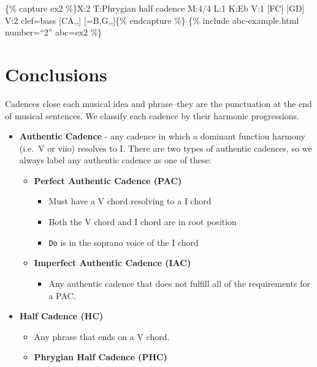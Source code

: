 \documentclass{book}
\providecommand{\tightlist}{%
  \setlength{\itemsep}{0pt}\setlength{\parskip}{0pt}}
\begin{document}
\{\% capture ex2 \%\}X:2 T:Phrygian half cadence M:4/4 L:1 K:Eb V:1
{[}FC{]}\textbar{} {[}GD{]}\textbar{]} V:2 clef=bass {[}CA,,{]}\textbar{}
{[}=B,G,,{]}\textbar{]}\{\% endcapture \%\} \{\% include abc-example.html
number=``2'' abc=ex2 \%\}

\hypertarget{conclusions-1}{%
\section{Conclusions}\label{conclusions-1}}

Cadences close each musical idea and phrase--they are the punctuation at the
end of musical sentences. We classify each cadence by their harmonic
progressions.

\begin{itemize}
\tightlist
\item
  \textbf{Authentic Cadence} - any cadence in which a dominant function
  harmony (i.e.~V or viio) resolves to I. There are two types of authentic
  cadences, so we always label any authentic cadence as one of these:

  \begin{itemize}
  \tightlist
  \item
    \textbf{Perfect Authentic Cadence (PAC)}

    \begin{itemize}
    \tightlist
    \item
      Must have a V chord resolving to a I chord
    \item
      Both the V chord and I chord are in root position
    \item
      \texttt{Do} is in the soprano voice of the I chord
    \end{itemize}
  \item
    \textbf{Imperfect Authentic Cadence (IAC)}

    \begin{itemize}
    \tightlist
    \item
      Any authentic cadence that does not fulfill all of the requirements for
      a PAC.
    \end{itemize}
  \end{itemize}
\item
  \textbf{Half Cadence (HC)}

  \begin{itemize}
  \tightlist
  \item
    Any phrase that ends on a V chord.
  \item
    \textbf{Phrygian Half Cadence (PHC)}


\end{itemize}
\end{itemize}
\end{document}
